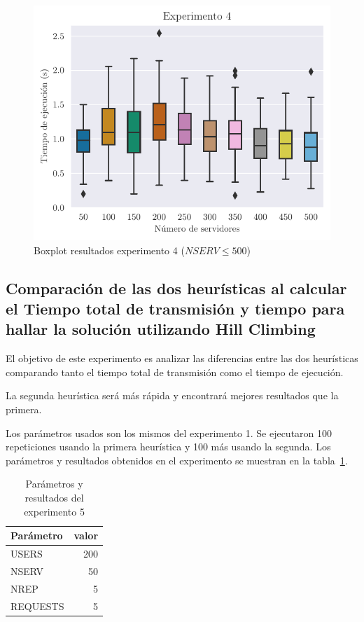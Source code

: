 \begin{figure}[H]
    \centering
    \includegraphics{include/plots/ex4_s_time_bplot.pdf}
    \caption{Boxplot resultados experimento 4 ($NSERV \leq 500$)}%
    \label{fig:ex4s}
\end{figure}

\pagebreak

\subsection{Comparación de las dos heurísticas al calcular el Tiempo total de transmisión y tiempo para hallar la solución utilizando Hill Climbing}
\label{sub:diffHC}

El objetivo de este experimento es analizar las diferencias entre las dos heurísticas comparando
tanto el tiempo total de transmisión como el tiempo de ejecución.

\begin{hyp*}
La segunda heurística será más rápida y encontrará mejores resultados que la primera.
\end{hyp*}

Los parámetros usados son los mismos del experimento 1.
Se ejecutaron 100 repeticiones usando la primera heurística y 100 más usando la segunda.
Los parámetros y resultados obtenidos en el experimento se muestran en la tabla~\ref{tab:ex5}.

\begin{table}[H]
    \caption{Parámetros y resultados del experimento 5}%
    \label{tab:ex5}
    \begin{center}
    \begin{tabular}{lr}
    \toprule
    Parámetro & valor \\
    \midrule
    USERS & 200 \\
    NSERV & 50 \\
    NREP & 5 \\
    REQUESTS & 5\\
    \bottomrule
    \end{tabular}
    \hspace{2em}
    
    \end{center}
\end{table}

